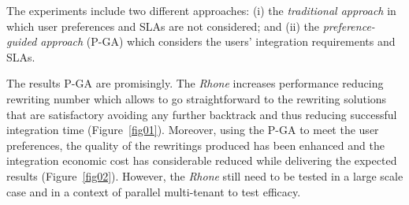 
The experiments include two different approaches: (i) the \textit{traditional approach} in which user preferences and SLAs are not considered; and (ii) the \textit{preference-guided approach} (P-GA) which considers the users' integration requirements and SLAs.
%

The results P-GA are promisingly.  
The \textit{Rhone} increases performance reducing rewriting number which allows to go straightforward to the rewriting solutions that are satisfactory avoiding any further backtrack and thus reducing successful integration time (Figure~\ref{fig01}). Moreover, using the P-GA to meet the user preferences, the quality of the rewritings produced has been enhanced and the integration economic cost has considerable reduced while delivering the expected results (Figure~\ref{fig02}). However, the \textit{Rhone} still need to be tested in a large scale case and in a context of parallel multi-tenant to test efficacy.
